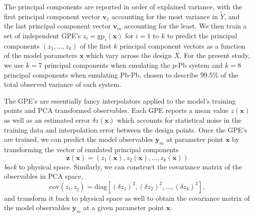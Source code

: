 \documentclass[aps,prc,reprint,amsmath,nofootinbib]{revtex4-1}
\newcommand{\x}{\mathbf{x}}
\newcommand{\y}{\mathbf{y}}
\begin{document}
The principal components are reported in order of explained variance, with the first principal component vector $\mathbf{v}_1$ accounting for the most variance in $\tilde{Y}$, and the last principal component vector $\mathbf{v}_m$ accounting for the least.
We then train a set of independent GPE's $z_i = \mathrm{gp}_i(\x)$ for $i=1$ to $k$ to predict the principal components $(z_1, \dots, z_k)$ of the first $k$ principal component vectors as a function of the model parameters $\x$ which vary across the design $X$.
For the present study, we use $k=7$ principal components when emulating the $p$-Pb system and $k=8$ principal components when emulating Pb-Pb, chosen to describe 99.5\% of the total observed variance of each system.

The GPE's are essentially fancy interpolators applied to the model's training points and PCA transformed observables.
Each GPE reports a mean value $z(\x)$ as well as an estimated error $\delta z(\x)$ which accounts for statistical noise in the training data and interpolation error between the design points.
Once the GPE's are trained, we can predict the model observables $\y_m$ at parameter point $\x$ by transforming the vector of emulated principal components
\begin{equation}
  \mathbf{z}(\x) = (z_1(\x), z_2(\x), \dots, z_k(\x))
\end{equation}
\emph{back} to physical space.
Similarly, we can construct the covariance matrix of the observables in PCA space,
\begin{equation}
\mathrm{cov}(z_i, z_j) = \mathrm{diag}[(\delta z_{1})^2, (\delta z_2)^2, \dots, (\delta z_k)^2 ],
\end{equation}
and transform it back to physical space as well to obtain the covariance matrix of the model observables $\y_m$ at a given parameter point $\x$.
\end{document}
